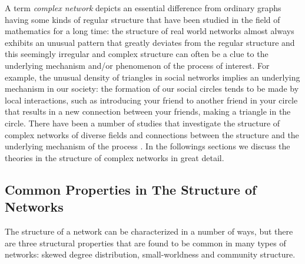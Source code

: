 \documentclass{article}
\begin{document}
	A term \textit{complex network} depicts an essential difference from ordinary graphs having some kinds of regular structure that have been studied in the field of mathematics for a long time: the structure of real world networks almost always exhibits an unusual pattern that greatly deviates from the regular structure and this seemingly irregular and complex structure can often be a clue to the underlying mechanism and/or phenomenon of the process of interest.  For example, the unusual density of triangles in social networks implies an underlying mechanism in our society: the formation of our social circles tends to be made by local interactions, such as introducing your friend to another friend in your circle that results in a new connection between your friends, making a triangle in the circle. There have been a number of studies that investigate the structure of complex networks of diverse fields and connections between the structure and the underlying mechanism of the process \cite{Strogatz2001, Newman03thestructure, StatisticalMechanics, boccaletti06}. In the followings sections we discuss the theories in the structure of complex networks in great detail.
	
	\subsection{Common Properties in The Structure of Networks}
	The structure of a network can be characterized in a number of ways, but there are three structural properties that are found to be common in many types of networks: skewed degree distribution, small-worldness and community structure.
	
\end{document}
